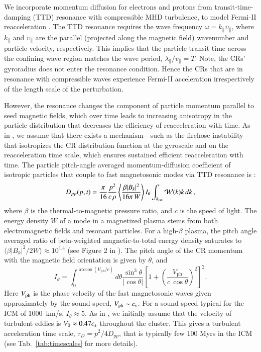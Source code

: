 \documentclass[a4paper,fleqn,usenatbib]{mnras}
\newcommand{\Vph}{V_\mathrm{ph}}
\begin{document}
We incorporate momentum diffusion for electrons and protons from
transit-time-damping (TTD) resonance with compressible MHD turbulence,
to model Fermi-II reacceleration \citep{brunetti07,brunetti11}. The
TTD resonance requires the wave frequency
$\omega=k_\parallel\upsilon_\parallel$, where $k_\parallel$ and
$\upsilon_\parallel$ are the parallel (projected along the magnetic
field) wavenumber and particle velocity, respectively. This implies
that the particle transit time across the confining wave region
matches the wave period, $\lambda_{\parallel}/v_{\parallel}=T$. Note,
the CRs' gyroradius does not enter the resonance condition. Hence the
CRs that are in resonance with compressible waves experience Fermi-II
acceleration irrespectively of the length scale of the perturbation.

However, the resonance changes the component of particle momentum
parallel to seed magnetic fields, which over time leads to increasing
anisotropy in the particle distribution that decreases the efficiency
of reacceleration with time. As in \citet{brunetti11}, we assume that
there exists a mechanism---such as the firehose instability---that
isotropizes the CR distribution function at the gyroscale and on the
reacceleration time scale, which ensures sustained efficient
reacceleration with time. The particle pitch-angle averaged
momentum-diffusion coefficient of isotropic particles that couple to
fast magnetosonic modes via TTD resonance is \citep[][ Eqn. 47]{brunetti07}:
\begin{eqnarray}
  D_{pp}(p,t) = \frac{\pi}{16} \frac{p^2}{c\,\rho}
  \left\langle\frac{\beta |B_k|^2}{16 \pi \,W}\right\rangle
  I_\theta
  \int_{k_{\mathrm{cut}}}\mathcal{W}(k)k\,d k\,,
\label{eq:dpp}
\end{eqnarray}
where $\beta$ is the thermal-to-magnetic pressure ratio, and $c$
is the speed of light. The energy density $W$ of a mode in a
magnetized plasma stems from both electromagnetic fields and resonant
particles. For a high-$\beta$ plasma, the pitch angle averaged ratio of
beta-weighted magnetic-to-total energy density saturates to $\langle\beta
|B_k|^2/2W\rangle\approx 10^{1.4}$ (see Figure 2 in
\citealt{brunetti07}). The pitch angle of the CR momentum with the
magnetic field orientation is given by $\theta$, and
\begin{equation}
  \label{eq:I_theta}
  I_\theta=\int_0^{\arccos(\Vph/c)} d\theta {\frac{ \sin^3 \theta }{
    |\cos \theta | }}
\left[1+\left(\frac{\Vph}{c\,\cos{\theta}}\right)^2\right]^2.
\end{equation}
Here $V_{\mathrm{ph}}$ is the phase velocity of the fast magnetosonic waves
given approximately by the sound speed, $\Vph \sim c_\rmn{s}$. For a
sound speed typical for the ICM of 1000~km/s, $I_\theta\approx5$. As
in \cite{brunetti07}, we initially assume that the velocity of
turbulent eddies is $V_0\approx 0.47 c_{\mathrm{s}}$ throughout the
cluster. This gives a turbulent acceleration time scale, $\tau_{D} =
p^2/4D_{pp}$, that is typically few 100 Myrs in the ICM (see
Tab.~\ref{tab:timescales} for more details).
\end{document}
